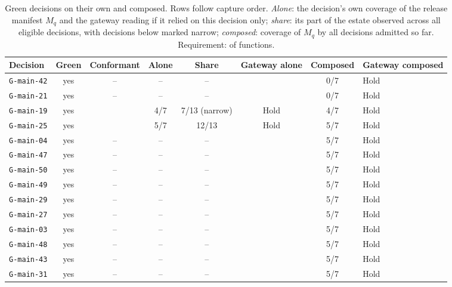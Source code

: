 \begin{table}[pos=t]
\centering\small
\caption{Green decisions on their own and composed. Rows follow capture order. \emph{Alone}: the decision's own coverage of the release manifest $M_q$ and the gateway reading if it relied on this decision only; \emph{share}: its part of the estate observed across all eligible decisions, with decisions below \FixTauRel{} marked narrow; \emph{composed}: coverage of $M_q$ by all decisions admitted so far. Requirement: \FixTauQ{} of \FixMq{} functions.}
\label{tab:coverage}
\begin{tabularx}{\textwidth}{@{}lccccccY@{}}
\toprule
Decision & Green & Conformant & Alone & Share & Gateway alone & Composed & Gateway composed \\
\midrule
\texttt{G-main-42} & yes & -- & -- & -- &  & 0/7 & Hold \\
\texttt{G-main-21} & yes & -- & -- & -- &  & 0/7 & Hold \\
\texttt{G-main-19} & yes & \Pass{} & 4/7 & 7/13 (narrow) & Hold & 4/7 & Hold \\
\texttt{G-main-25} & yes & \Pass{} & 5/7 & 12/13 & Hold & 5/7 & Hold \\
\texttt{G-main-04} & yes & -- & -- & -- &  & 5/7 & Hold \\
\texttt{G-main-47} & yes & -- & -- & -- &  & 5/7 & Hold \\
\texttt{G-main-50} & yes & -- & -- & -- &  & 5/7 & Hold \\
\texttt{G-main-49} & yes & -- & -- & -- &  & 5/7 & Hold \\
\texttt{G-main-29} & yes & -- & -- & -- &  & 5/7 & Hold \\
\texttt{G-main-27} & yes & -- & -- & -- &  & 5/7 & Hold \\
\texttt{G-main-03} & yes & -- & -- & -- &  & 5/7 & Hold \\
\texttt{G-main-48} & yes & -- & -- & -- &  & 5/7 & Hold \\
\texttt{G-main-43} & yes & -- & -- & -- &  & 5/7 & Hold \\
\texttt{G-main-31} & yes & -- & -- & -- &  & 5/7 & Hold \\

\end{tabularx}
\end{table}
